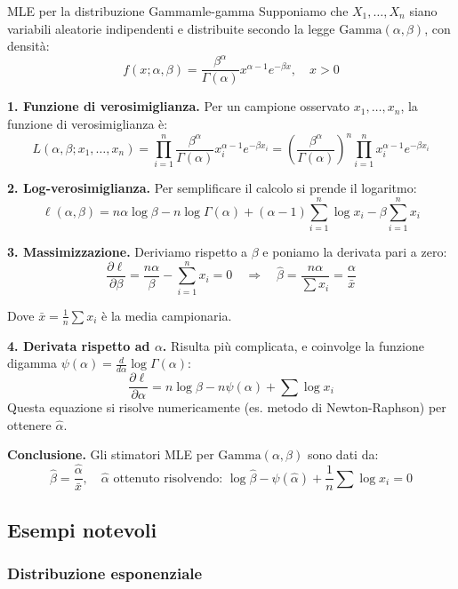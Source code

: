 \begin{esempio}{MLE per la distribuzione Gamma}{mle-gamma}
Supponiamo che \( X_1, \dots, X_n \) siano variabili aleatorie indipendenti e distribuite secondo la legge \( \mathrm{Gamma}(\alpha, \beta) \), con densità:
\[
f(x; \alpha, \beta) = \frac{\beta^\alpha}{\Gamma(\alpha)} x^{\alpha - 1} e^{-\beta x}, \quad x > 0
\]

\textbf{1. Funzione di verosimiglianza.}  
Per un campione osservato \( x_1, \dots, x_n \), la funzione di verosimiglianza è:
\[
L(\alpha, \beta; x_1, \dots, x_n) = \prod_{i=1}^n \frac{\beta^\alpha}{\Gamma(\alpha)} x_i^{\alpha - 1} e^{-\beta x_i}
= \left(\frac{\beta^\alpha}{\Gamma(\alpha)}\right)^n \prod_{i=1}^n x_i^{\alpha - 1} e^{-\beta x_i}
\]

\textbf{2. Log-verosimiglianza.}  
Per semplificare il calcolo si prende il logaritmo:
\[
\ell(\alpha, \beta) = n\alpha \log \beta - n \log \Gamma(\alpha) + (\alpha - 1) \sum_{i=1}^n \log x_i - \beta \sum_{i=1}^n x_i
\]

\textbf{3. Massimizzazione.}  
Deriviamo rispetto a \( \beta \) e poniamo la derivata pari a zero:
\[
\frac{\partial \ell}{\partial \beta} = \frac{n\alpha}{\beta} - \sum_{i=1}^n x_i = 0 \quad \Rightarrow \quad
\hat{\beta} = \frac{n\alpha}{\sum x_i} = \frac{\alpha}{\bar{x}}
\]

Dove \( \bar{x} = \frac{1}{n} \sum x_i \) è la media campionaria.

\textbf{4. Derivata rispetto ad \( \alpha \).}  
Risulta più complicata, e coinvolge la funzione digamma \( \psi(\alpha) = \frac{d}{d\alpha} \log \Gamma(\alpha) \):
\[
\frac{\partial \ell}{\partial \alpha} = n \log \beta - n \psi(\alpha) + \sum \log x_i
\]
Questa equazione si risolve numericamente (es. metodo di Newton-Raphson) per ottenere \( \hat{\alpha} \).

\medskip
\textbf{Conclusione.} Gli stimatori MLE per \( \mathrm{Gamma}(\alpha, \beta) \) sono dati da:
\[
\hat{\beta} = \frac{\hat{\alpha}}{\bar{x}}, \quad \hat{\alpha} \text{ ottenuto risolvendo: } \log \hat{\beta} - \psi(\hat{\alpha}) + \frac{1}{n} \sum \log x_i = 0
\]
\end{esempio}


\subsection{Esempi notevoli}
\subsubsection{Distribuzione esponenziale}

